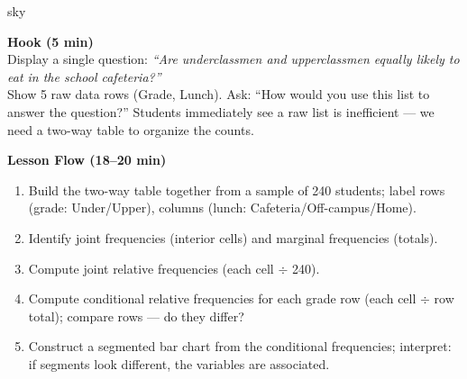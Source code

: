 \documentclass[10pt]{article}
\begin{document}
\begin{skillbox}{sky}
\begin{minipage}[t]{0.48\linewidth}
    \textbf{Hook (5 min)}\\
    Display a single question: \textit{``Are underclassmen and upperclassmen equally likely
    to eat in the school cafeteria?''}\\[4pt]
    Show 5 raw data rows (Grade, Lunch). Ask: ``How would you use this list to answer the
    question?'' Students immediately see a raw list is inefficient --- we need a
    two-way table to organize the counts.
\end{minipage}
\hfill
\begin{minipage}[t]{0.48\linewidth}
    \textbf{Lesson Flow (18--20 min)}
    \begin{enumerate}
        \item Build the two-way table together from a sample of 240 students;
              label rows (grade: Under/Upper), columns (lunch: Cafeteria/Off-campus/Home).
        \item Identify joint frequencies (interior cells) and marginal frequencies (totals).
        \item Compute joint relative frequencies (each cell $\div$ 240).
        \item Compute conditional relative frequencies for each grade row
              (each cell $\div$ row total); compare rows --- do they differ?
        \item Construct a segmented bar chart from the conditional frequencies; interpret:
              if segments look different, the variables are associated.
    \end{enumerate}
\end{minipage}
\end{skillbox}
\end{document}
